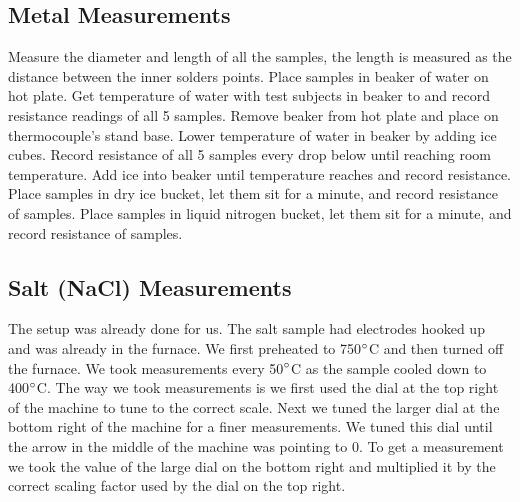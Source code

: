 \documentclass{article}
\begin{document}
\subsection{Metal Measurements}
Measure the diameter and length of all the samples, the length is measured as the distance between the inner solders points. Place samples in beaker of water on hot plate. Get temperature of water with test subjects in beaker to  and record resistance readings of all 5 samples. Remove beaker from hot plate and place on thermocouple’s stand base. Lower temperature of water in beaker by adding ice cubes. Record resistance of all 5 samples every  drop below  until reaching room temperature. Add ice into beaker until temperature reaches  and record resistance.
Place samples in dry ice bucket, let them sit for a minute, and record resistance of samples. Place samples in liquid nitrogen bucket, let them sit for a minute, and record resistance of samples.

\subsection{Salt (NaCl) Measurements}
The setup was already done for us. The salt sample had electrodes hooked up and was already in the furnace. We first preheated to 750$\degree$C and then turned off the furnace. We took measurements every 50$\degree$C as the sample cooled down to 400$\degree$C. The way we took measurements is we first used the dial at the top right of the machine to tune to the correct scale. Next we tuned the larger dial at the bottom right of the machine for a finer measurements. We tuned this dial until the arrow in the middle of the machine was pointing to 0. To get a measurement we took the value of the large dial on the bottom right and multiplied it by the correct scaling factor used by the dial on the top right.
\end{document}
